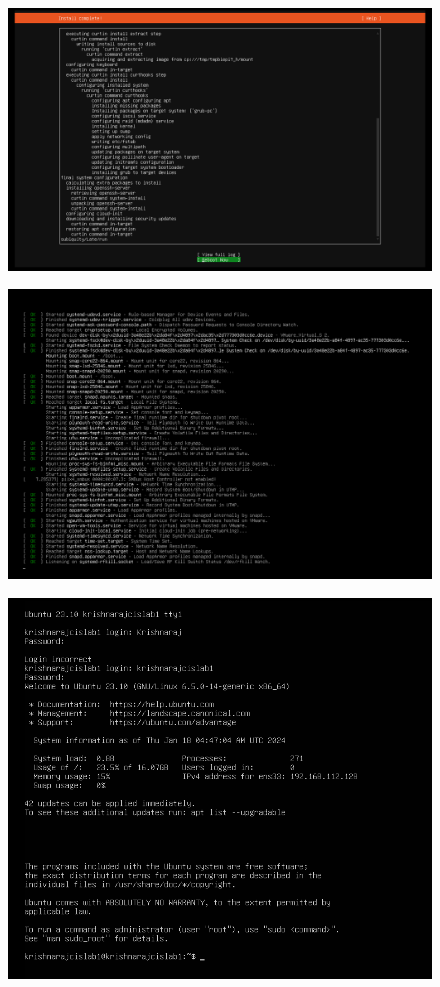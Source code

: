 \documentclass[11pt]{article}
\begin{document}
\begin{figure}[H]
    \centering
    \includegraphics[width=.95\textwidth]{screenshots/17.png}
    \caption{}
\end{figure}
\begin{figure}[H]
    \centering
    \includegraphics[width=.95\textwidth]{screenshots/18.png}
    \caption{}
\end{figure}
\begin{figure}[H]
    \centering
    \includegraphics[width=.95\textwidth]{screenshots/19.png}
    \caption{}
\end{figure}
\end{document}
